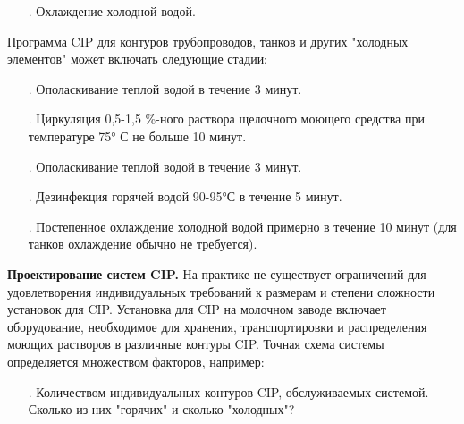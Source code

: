 {\begin{itemize}[leftmargin=2.15cm, labelwidth=0.65cm, labelsep=0.0cm]
	\item[\theitemcntr. ] Охлаждение холодной водой.
	\addtocounter{itemcntr}{1}
	
	\addtocounter{itemcntr}{1}
	
	\setcounter{itemcntr}{1}
\end{itemize}   

\par \redline Программа CIP для контуров трубопроводов, танков и других "холодных элементов" может включать следующие стадии:

\begin{itemize}[leftmargin=2.15cm, labelwidth=0.65cm, labelsep=0.0cm] 
	
	\item[\theitemcntr. ] Ополаскивание теплой водой в течение 3 минут.
	\addtocounter{itemcntr}{1}
	
	\item[\theitemcntr. ] Циркуляция 0,5-1,5 \%-ного раствора щелочного моющего средства при температуре 75° С не больше 10 минут.
	\addtocounter{itemcntr}{1}
	
	\item[\theitemcntr. ] Ополаскивание теплой водой в течение 3 минут.
	\addtocounter{itemcntr}{1}
	
	\item[\theitemcntr. ] Дезинфекция горячей водой 90-95°С в течение 5 минут.
	\addtocounter{itemcntr}{1}
	
	\item[\theitemcntr. ] Постепенное охлаждение холодной водой примерно в течение 10 минут (для танков охлаждение обычно не требуется).
	\addtocounter{itemcntr}{1}
	
	\setcounter{itemcntr}{1}
\end{itemize}


\par \redline \textbf{Проектирование систем CIP.} На практике не существует ограничений для удовлетворения индивидуальных требований к размерам и степени сложности установок для CIP. Установка для CIP на молочном заводе включает оборудование, необходимое для хранения, транспортировки и распределения моющих растворов в различные контуры CIP. Точная схема системы определяется множеством факторов, например:

\begin{itemize}[leftmargin=2.15cm, labelwidth=0.65cm, labelsep=0.0cm] 
	
	\item[\theitemcntr. ] Количеством индивидуальных контуров CIP, обслуживаемых системой. Сколько из них "горячих" и сколько "холодных"?
	\addtocounter{itemcntr}{1}
	

\end{itemize}}
